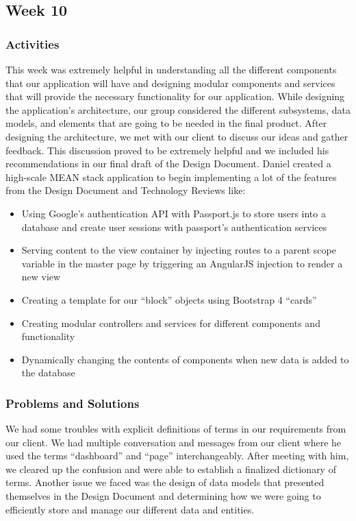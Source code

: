\documentclass[journal,10pt,onecolumn,compsoc]{IEEEtran} \usepackage[margin=1.0in]{geometry} \usepackage{pdfpages}
\begin{document}
    \subsection{Week 10}
    \subsubsection{Activities} 
    This week was extremely helpful in understanding all the different components that our application will have and designing modular components and services that will provide the necessary functionality for our application. While designing the application's architecture, our group considered the different subsystems, data models, and elements that are going to be needed in the final product. After designing the architecture, we met with our client to discuss our ideas and gather feedback. This discussion proved to be extremely helpful and we included his recommendations in our final draft of the Design Document.
    \noindent Daniel created a high-scale MEAN stack application to begin implementing a lot of the features from the Design Document and Technology Reviews like:
    \begin{itemize}
        \item Using Google's authentication API with Passport.js to store users into a database and create user sessions with passport's authentication services
        \item Serving content to the view container by injecting routes to a parent scope variable in the master page by triggering an AngularJS injection to render a new view
        \item Creating a template for our “block” objects using Bootstrap 4 “cards”
        \item Creating modular controllers and services for different components and functionality
        \item Dynamically changing the contents of components when new data is added to the database
    \end{itemize}
    
    \subsubsection{Problems and Solutions} 
    We had some troubles with explicit definitions of terms in our requirements from our client. We had multiple conversation and messages from our client where he used the terms ``dashboard'' and ``page'' interchangeably. After meeting with him, we cleared up the confusion and were able to establish a finalized dictionary of terms. Another issue we faced was the design of data models that presented themselves in the Design Document and determining how we were going to efficiently store and manage our different data and entities. 
\end{document}
